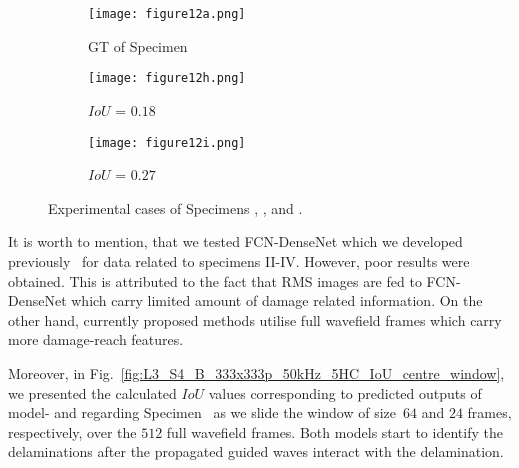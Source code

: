 \begin{figure} [!h]
	\par\medskip
	\begin{subfigure}[b]{0.32\textwidth}
		\centering
		\texttt{[image: figure12a.png]}
		\caption{GT of Specimen~}
		\label{fig:gt_specimen_4}
	\end{subfigure}
	\hfill
	\begin{subfigure}[b]{0.32\textwidth}
		\centering
		\texttt{[image: figure12h.png]}
		\caption{\(IoU\) = \(0.18\)}  
		\label{fig:L3_S4_B_saeed}
	\end{subfigure}
	\hfill
	\begin{subfigure}[b]{0.32\textwidth}
		\centering
		\texttt{[image: figure12i.png]}
		\caption{\(IoU\) = \(0.27\)} 
		\label{fig:L3_S4_B_ijjeh}
	\end{subfigure}
	\caption{Experimental cases of Specimens , , and .}
	\label{fig:exp_case}
\end{figure} 

It is worth to mention, that we tested FCN-DenseNet which we developed previously~\cite{Ijjeh2021} for data related to specimens II-IV. 
However, poor results were obtained. 
This is attributed to the fact that RMS images are fed to FCN-DenseNet which carry limited amount of damage related information. 
On the other hand, currently proposed methods utilise full wavefield frames which carry more damage-reach features. 

Moreover, in Fig.~\ref{fig:L3_S4_B_333x333p_50kHz_5HC_IoU_centre_window}, we presented the calculated \(IoU\) values corresponding to predicted outputs of model- and  regarding Specimen~ as we slide the window of size~\(64\) and \(24\) frames, respectively, over the \(512\) full wavefield frames.
Both models start to identify the delaminations after the propagated guided waves interact with the delamination.

